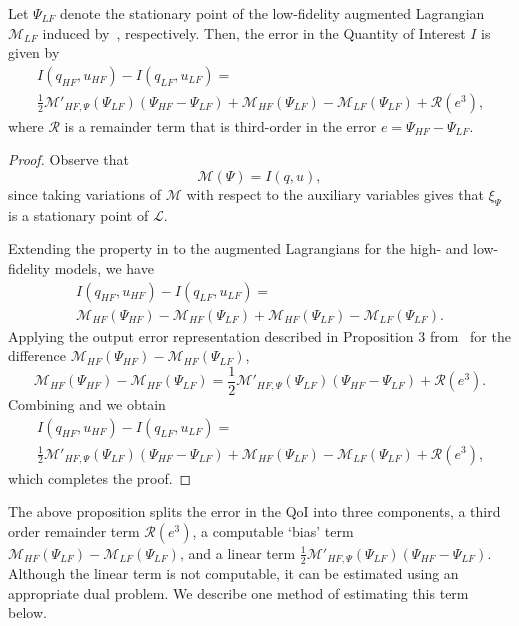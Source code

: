\begin{proposition}
Let $\Psi_{LF}$ denote the stationary point of the low-fidelity augmented Lagrangian $\mathcal{M}_{LF}$ induced by~, respectively. Then, the error in the Quantity of Interest $I$ is given by
%
\begin{multline}
\label{eq:semifinErrExp}
I(q_{HF},u_{HF})-I(q_{LF},u_{LF})=\\\frac{1}{2}\mathcal{M}'_{HF,\Psi}(\Psi_{LF})(\Psi_{HF}-\Psi_{LF})+\mathcal{M}_{HF}(\Psi_{LF})-\mathcal{M}_{LF}(\Psi_{LF})+\mathcal{R}(e^3)\textrm{,}
\end{multline}
%
where $\mathcal{R}$ is a remainder term that is third-order in the error $e=\Psi_{HF}-\Psi_{LF}$.
\end{proposition}
%
\begin{proof}
%
Observe that
%
\begin{equation}
\label{eq:MeqI}
\mathcal{M}(\Psi)=I(q,u),
\end{equation}
%
since taking variations of $\mathcal{M}$ with respect to the auxiliary variables gives that $\xi_\Psi$ is a stationary point of $\mathcal{L}$.

Extending the property in  to the augmented Lagrangians for the high- and low-fidelity models, we have
%
\begin{multline}
\label{eq:repIwithM}
I(q_{HF},u_{HF})-I(q_{LF},u_{LF})=\\\mathcal{M}_{HF}(\Psi_{HF})-\mathcal{M}_{HF}(\Psi_{LF})+\mathcal{M}_{HF}(\Psi_{LF})-\mathcal{M}_{LF}(\Psi_{LF})\textrm{.}
\end{multline}
%
Applying the output error representation described in Proposition 3 from~\cite{BecVex05} for the difference $\mathcal{M}_{HF}(\Psi_{HF})-\mathcal{M}_{HF}(\Psi_{LF})$,
\begin{equation}
\label{eq:beckvex}
\mathcal{M}_{HF}(\Psi_{HF})-\mathcal{M}_{HF}(\Psi_{LF}) = \frac{1}{2}\mathcal{M}'_{HF,\Psi}(\Psi_{LF})(\Psi_{HF}-\Psi_{LF})+\mathcal{R}(e^3)\textrm{.}
\end{equation}
Combining  and  we obtain
\begin{multline}
\label{eq:preadj}
I(q_{HF},u_{HF})-I(q_{LF},u_{LF})=\\\frac{1}{2}\mathcal{M}'_{HF,\Psi}(\Psi_{LF})(\Psi_{HF}-\Psi_{LF})+\mathcal{M}_{HF}(\Psi_{LF})-\mathcal{M}_{LF}(\Psi_{LF})+\mathcal{R}(e^3)\textrm{,}
\end{multline}
which completes the proof.
\end{proof}
%

The above proposition splits the error in the QoI into three components, a third order remainder term $\mathcal{R}(e^3)$, a computable `bias' term $\mathcal{M}_{HF}(\Psi_{LF})-\mathcal{M}_{LF}(\Psi_{LF})$, and a linear term $\frac{1}{2}\mathcal{M}'_{HF,\Psi}(\Psi_{LF})(\Psi_{HF}-\Psi_{LF})$. Although the linear term is not computable, it can be estimated using an appropriate dual problem. We describe one method of estimating this term below.

